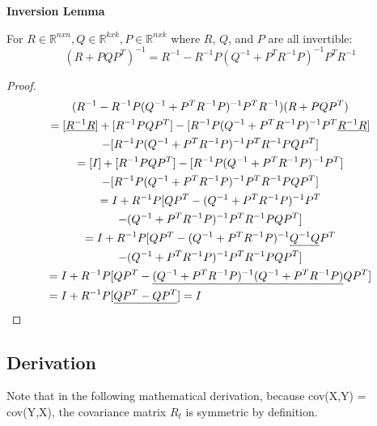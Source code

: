 \begin{lemma}{\textbf{Inversion Lemma \cite{probabilisticRobotics}}} \label{lemmaInversion}
	
For \(R \in \mathbb{R}^{nxn}, Q \in \mathbb{R}^{kxk}, P \in \mathbb{R}^{nxk}\) where \(R\), \(Q\), and \(P\) are all invertible:
\[
(R + PQP^T)^{-1} = R^{-1} - R^{-1}P(Q^{-1} + P^T R^{-1}P)^{-1} P^T R^{-1}
\]
\end{lemma}
\begin{proof}
\begin{multline}
( R^{-1} - R^{-1}P(Q^{-1} + P^T R^{-1}P)^{-1} P^T R^{-1}) (R + PQP^T) \\
= [\underline{R^{-1}R}] + [R^{-1}PQP^T] - [R^{-1}P(Q^{-1} + P^T R^{-1}P)^{-1} P^T \underline{R^{-1}R}] \\
- [R^{-1}P(Q^{-1} + P^T R^{-1}P)^{-1} P^T R^{-1}PQP^T] \\
= [I] + [R^{-1}PQP^T] - [R^{-1}P(Q^{-1} + P^T R^{-1}P)^{-1} P^T] \\
- [R^{-1}P(Q^{-1} + P^T R^{-1}P)^{-1} P^T R^{-1}PQP^T] \\
= I + R^{-1}P [QP^T - (Q^{-1} + P^T R^{-1}P)^{-1} P^T \\
- (Q^{-1} + P^T R^{-1}P)^{-1} P^T R^{-1}PQP^T] \\
= I + R^{-1}P [QP^T - (Q^{-1} + P^T R^{-1}P)^{-1} \underline{Q^{-1} Q} P^T \\
- (Q^{-1} + P^T R^{-1}P)^{-1} P^T R^{-1}PQP^T] \\
= I + R^{-1}P [QP^T - \underline{(Q^{-1} + P^T R^{-1}P)^{-1} (Q^{-1} + P^T R^{-1}P)} Q P^T] \\
= I + R^{-1}P [\underline{QP^T - Q P^T}] = I \hfill
\end{multline}
\end{proof}


\subsection{Derivation}
Note that in the following mathematical derivation, because cov(X,Y) = cov(Y,X), the covariance matrix \(R_t\) is symmetric by definition.

